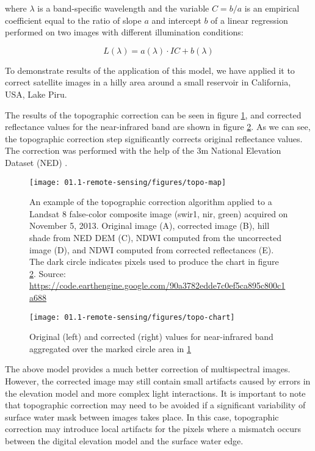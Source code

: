 where ${\lambda}$ is a band-specific wavelength and the variable $C = b / a$ is an empirical coefficient equal to the ratio of slope $a$ and intercept $b$ of a linear regression performed on two images with different illumination conditions:

\begin{equation}
\label{eq:topo-c-regression}
L(\lambda) = a(\lambda) \cdot IC + b(\lambda)
\end{equation}

To demonstrate results of the application of this model, we have applied it to correct satellite images in a hilly area around a small reservoir in California, USA, Lake Piru. 

The results of the topographic correction can be seen in figure \ref{fig:ch1-topo-map}, and corrected reflectance values for the near-infrared band are shown in figure \ref{fig:ch1-topo-chart}. As we can see, the topographic correction step significantly corrects original reflectance values. The correction was performed with the help of the 3m National Elevation Dataset (NED) \cite{gesch2002national}.

\begin{figure}[H]
	\texttt{[image: 01.1-remote-sensing/figures/topo-map]}
	\caption{An example of the topographic correction algorithm \cite{tan2013improved} applied to a Landsat 8 false-color composite image (swir1, nir, green) acquired on November 5, 2013. Original image (A), corrected image (B), hill shade from NED DEM (C), NDWI computed from the uncorrected image (D), and NDWI computed from corrected reflectances (E). The dark circle indicates pixels used to produce the chart in figure \ref{fig:ch1-topo-chart}.  Source: \url{https://code.earthengine.google.com/90a3782edde7c0ef5ca895c800c1a688}}
	\label{fig:ch1-topo-map}
\end{figure}

\begin{figure}[H]
	\texttt{[image: 01.1-remote-sensing/figures/topo-chart]}
	\caption{Original (left) and corrected (right) values for near-infrared band aggregated over the marked circle area in \protect \ref{fig:ch1-topo-map}}
	\label{fig:ch1-topo-chart}
\end{figure}


The above model provides a much better correction of multispectral images. However, the corrected image may still contain small artifacts caused by errors in the elevation model and more complex light interactions. It is important to note that topographic correction may need to be avoided if a significant variability of surface water mask between images takes place. In this case, topographic correction may introduce local artifacts for the pixels where a mismatch occurs between the digital elevation model and the surface water edge.

